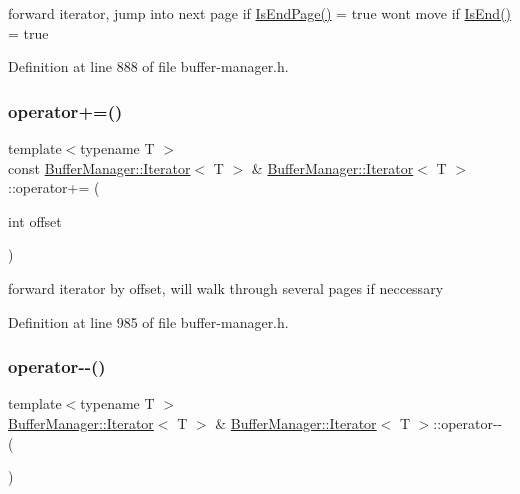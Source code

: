 forward iterator, jump into next page if {\ttfamily \mbox{\hyperlink{class_buffer_manager_1_1_iterator_a6afaceac9683f05d9e1ecfc9ff5f3a0f}{Is\+End\+Page()}} = true} won\textquotesingle{}t move if {\ttfamily \mbox{\hyperlink{class_buffer_manager_1_1_iterator_a02a38a84fd54e45d06818d2807b172d8}{Is\+End()}} = true} 

Definition at line 888 of file buffer-\/manager.\+h.

\mbox{\label{class_buffer_manager_1_1_iterator_aced12f95569a91d98a83bf635d671e25}} 
\subsubsection{\texorpdfstring{operator+=()}{operator+=()}}
{\footnotesize\ttfamily template$<$typename T $>$ \\
const \mbox{\hyperlink{class_buffer_manager_1_1_iterator}{Buffer\+Manager\+::\+Iterator}}$<$ T $>$ \& \mbox{\hyperlink{class_buffer_manager_1_1_iterator}{Buffer\+Manager\+::\+Iterator}}$<$ T $>$\+::operator+= (\begin{DoxyParamCaption}\item[{int}]{offset }\end{DoxyParamCaption})\hspace{0.3cm}{\ttfamily [inline]}}

forward iterator by offset, will walk through several pages if neccessary 

Definition at line 985 of file buffer-\/manager.\+h.

\mbox{\label{class_buffer_manager_1_1_iterator_ab9959f549dcfa3f6daa47677552b673d}} 
\subsubsection{\texorpdfstring{operator-\/-\/()}{operator--()}}
{\footnotesize\ttfamily template$<$typename T $>$ \\
\mbox{\hyperlink{class_buffer_manager_1_1_iterator}{Buffer\+Manager\+::\+Iterator}}$<$ T $>$ \& \mbox{\hyperlink{class_buffer_manager_1_1_iterator}{Buffer\+Manager\+::\+Iterator}}$<$ T $>$\+::operator-\/-\/ (\begin{DoxyParamCaption}{ }\end{DoxyParamCaption})\hspace{0.3cm}{\ttfamily [inline]}}

